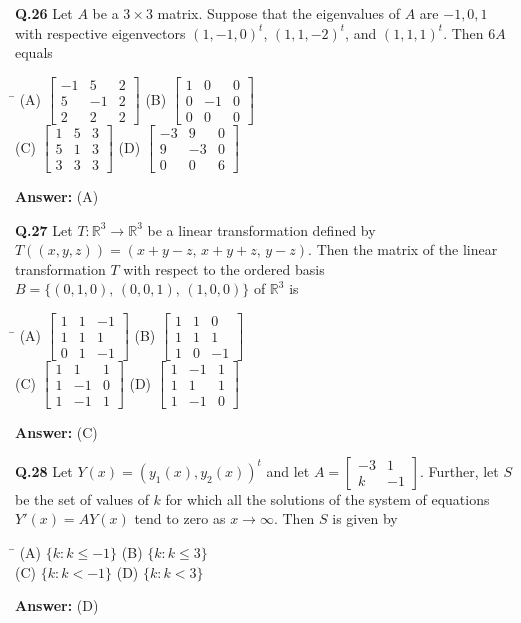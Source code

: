 \documentclass[11pt,a4paper]{article}
\newcommand{\optsfourA}[4]{%
  \begin{tabbing}
    \hspace{0.48\linewidth}\=\kill
    (A) #1 \> (B) #2 \\[2pt]
    (C) #3 \> (D) #4
  \end{tabbing}%
}
\newcommand{\ans}[1]{\textbf{Answer:} #1\par\medskip}
\begin{document}
\textbf{Q.26} Let $A$ be a $3 \times 3$ matrix. Suppose that the eigenvalues of $A$ are $-1, 0, 1$ with respective eigenvectors $(1,-1,0)^t$, $(1,1,-2)^t$, and $(1,1,1)^t$. Then $6A$ equals
\optsfourA{$\begin{bmatrix} -1 & 5 & 2 \\ 5 & -1 & 2 \\ 2 & 2 & 2 \end{bmatrix}$}{$\begin{bmatrix} 1 & 0 & 0 \\ 0 & -1 & 0 \\ 0 & 0 & 0 \end{bmatrix}$}{$\begin{bmatrix} 1 & 5 & 3 \\ 5 & 1 & 3 \\ 3 & 3 & 3 \end{bmatrix}$}{$\begin{bmatrix} -3 & 9 & 0 \\ 9 & -3 & 0 \\ 0 & 0 & 6 \end{bmatrix}$}
\ans{(A)}

\textbf{Q.27} Let $T : \mathbb{R}^3 \to \mathbb{R}^3$ be a linear transformation defined by $T((x,y,z)) = (x + y - z,\, x + y + z,\, y - z)$. Then the matrix of the linear transformation $T$ with respect to the ordered basis $B = \{(0,1,0),\, (0,0,1),\, (1,0,0)\}$ of $\mathbb{R}^3$ is
\optsfourA{$\begin{bmatrix} 1 & 1 & -1 \\ 1 & 1 & 1 \\ 0 & 1 & -1 \end{bmatrix}$}{$\begin{bmatrix} 1 & 1 & 0 \\ 1 & 1 & 1 \\ 1 & 0 & -1 \end{bmatrix}$}{$\begin{bmatrix} 1 & 1 & 1 \\ 1 & -1 & 0 \\ 1 & -1 & 1 \end{bmatrix}$}{$\begin{bmatrix} 1 & -1 & 1 \\ 1 & 1 & 1 \\ 1 & -1 & 0 \end{bmatrix}$}
\ans{(C)}

\textbf{Q.28} Let $Y(x) = (y_1(x), y_2(x))^t$ and let $A = \begin{bmatrix} -3 & 1 \\ k & -1 \end{bmatrix}$. Further, let $S$ be the set of values of $k$ for which all the solutions of the system of equations $Y'(x) = AY(x)$ tend to zero as $x \to \infty$. Then $S$ is given by
\optsfourA{$\{k : k \le -1\}$}{$\{k : k \le 3\}$}{$\{k : k < -1\}$}{$\{k : k < 3\}$}
\ans{(D)}
\end{document}

